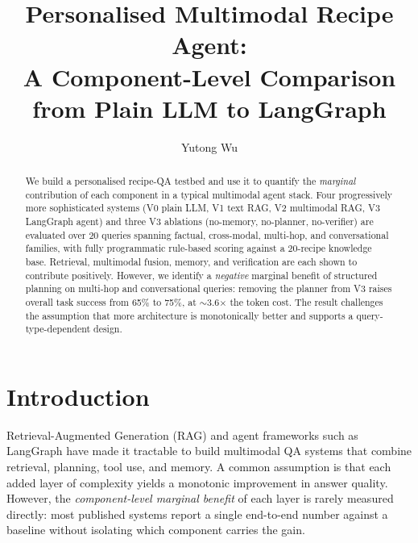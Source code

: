 \documentclass[sigconf, nonacm=true, anonymous=false]{acmart}
\begin{document}
\title{Personalised Multimodal Recipe Agent:\\
A Component-Level Comparison from Plain LLM to LangGraph}

\author{Yutong Wu}

\begin{abstract}
We build a personalised recipe-QA testbed and use it to quantify the
\emph{marginal} contribution of each component in a typical multimodal
agent stack. Four progressively more sophisticated systems (V0 plain LLM,
V1 text RAG, V2 multimodal RAG, V3 LangGraph agent) and three V3 ablations
(no-memory, no-planner, no-verifier) are evaluated over 20 queries spanning
factual, cross-modal, multi-hop, and conversational families, with
fully programmatic rule-based scoring against a 20-recipe knowledge base.
Retrieval, multimodal fusion, memory, and verification are each shown to
contribute positively. However, we identify a \emph{negative} marginal
benefit of structured planning on multi-hop and conversational queries:
removing the planner from V3 raises overall task success from 65\% to 75\%,
at $\sim$3.6$\times$ the token cost. The result challenges the assumption
that more architecture is monotonically better and supports a
query-type-dependent design.
\end{abstract}

\maketitle
\pagestyle{plain}        %
\thispagestyle{plain}    %

\section{Introduction}
\label{sec:intro}

Retrieval-Augmented Generation (RAG) and agent frameworks such as
LangGraph have made it tractable to build multimodal QA systems that
combine retrieval, planning, tool use, and memory. A common assumption is
that each added layer of complexity yields a monotonic improvement in
answer quality. However, the \emph{component-level marginal benefit} of
each layer is rarely measured directly: most published systems report a
single end-to-end number against a baseline without isolating which
component carries the gain.
\end{document}

